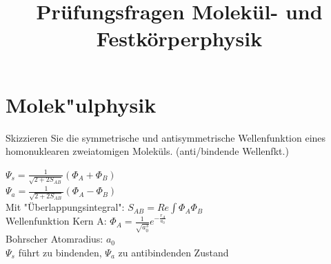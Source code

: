 \documentclass[a5paper,12pt,ngerman,grid=front %
,print
]{kartei}
\title{Prüfungsfragen Molekül- und Festkörperphysik}
\begin{document}
\setcardpagelayout

\section*{Molek"ulphysik}



	\begin{karte}{
		Skizzieren Sie die symmetrische und antisymmetrische Wellenfunktion eines 
		homonuklearen zweiatomigen Moleküls. (anti/bindende Wellenfkt.)
		}
		
		$\Psi_s=\frac{1}{\sqrt{2+2S_{AB}}}(\Phi_A+\Phi_B)$ \\
		
		$\Psi_a=\frac{1}{\sqrt{2+2S_{AB}}}(\Phi_A-\Phi_B)$ \\
		
		Mit "Überlappungsintegral": $S_{AB}=Re \int \Phi_A \Phi_B$ \\
		
		Wellenfunktion Kern A: $ \Phi_A= \frac{1}{\sqrt{a_0^3}}e^{-\frac{r_A}{a_0}}$ \\
		
		Bohrscher Atomradius: $a_0$ \\
		
		$\Psi_s$ führt zu bindenden, $\Psi_a$ zu antibindenden Zustand
		
	\end{karte}
\end{document}
